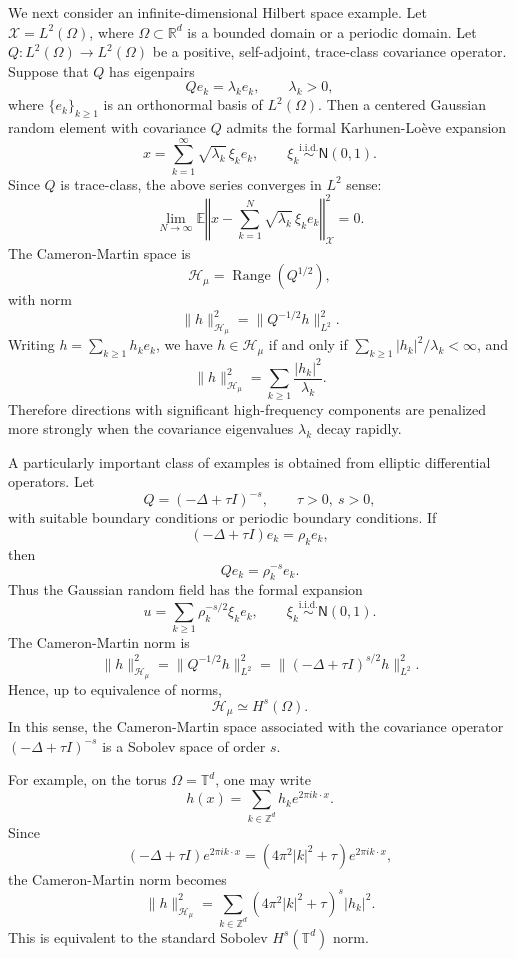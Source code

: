 \documentclass[11pt]{article}
\newcommand{\bbE}{\mathbb{E}}
\begin{document}
We next consider an infinite-dimensional Hilbert space example. Let $\mathcal X=L^2(\Omega)$, where $\Omega\subset\mathbb R^d$ is a bounded domain or a periodic domain. Let $Q:L^2(\Omega)\to L^2(\Omega)$ be a positive, self-adjoint, trace-class covariance operator. Suppose that $Q$ has eigenpairs
\[
    Q e_k = \lambda_k e_k,
    \qquad \lambda_k>0,
\]
where $\{e_k\}_{k\ge 1}$ is an orthonormal basis of $L^2(\Omega)$. Then a centered Gaussian random element with covariance $Q$ admits the formal Karhunen-Loève expansion
\[
    x=
    \sum_{k=1}^\infty\sqrt{\lambda_k}\,\xi_k e_k,
    \qquad
    \xi_k\stackrel{\mathrm{i.i.d.}}{\sim}\mathsf N(0,1).
\]
Since $Q$ is trace-class, the above series converges in $L^2$ sense:
\begin{equation*}
    \lim_{N\to\infty}\bbE\left\Vert x-\sum_{k=1}^N\sqrt{\lambda_k}\,\xi_k e_k\right\Vert^2_\mathcal{X}=0.
\end{equation*}
The Cameron-Martin space is
\[
    \mathcal H_\mu
    =
    \operatorname{Range}(Q^{1/2}),
\]
with norm
\[
    \|h\|_{\mathcal H_\mu}^2
    =
    \|Q^{-1/2}h\|_{L^2}^2.
\]
Writing $h=\sum_{k\ge 1} h_k e_k$, we have $h\in\mathcal H_\mu$ if and only if $\sum_{k\ge 1}|h_k|^2/\lambda_k<\infty$, and
\[
    \|h\|_{\mathcal H_\mu}^2
    =
    \sum_{k\ge 1}\frac{|h_k|^2}{\lambda_k}.
\]
Therefore directions with significant high-frequency components are penalized more strongly when the covariance eigenvalues $\lambda_k$ decay rapidly.

A particularly important class of examples is obtained from elliptic differential operators. Let
\[
    Q=(-\Delta+\tau I)^{-s},
    \qquad \tau>0,\ s>0,
\]
with suitable boundary conditions or periodic boundary conditions. If
\[
    (-\Delta+\tau I)e_k=\rho_k e_k,
\]
then
\[
    Qe_k=\rho_k^{-s}e_k.
\]
Thus the Gaussian random field has the formal expansion
\[
    u
    =
    \sum_{k\ge 1}\rho_k^{-s/2}\xi_k e_k,
    \qquad
    \xi_k\stackrel{\mathrm{i.i.d.}}{\sim}\mathsf N(0,1).
\]
The Cameron-Martin norm is
\[
    \|h\|_{\mathcal H_\mu}^2
    =
    \|Q^{-1/2}h\|_{L^2}^2
    =
    \|(-\Delta+\tau I)^{s/2}h\|_{L^2}^2.
\]
Hence, up to equivalence of norms,
\[
    \mathcal H_\mu \simeq H^s(\Omega).
\]
In this sense, the Cameron-Martin space associated with the covariance operator $(-\Delta+\tau I)^{-s}$ is a Sobolev space of order $s$.

For example, on the torus $\Omega=\mathbb T^d$, one may write
\[
    h(x)
    =
    \sum_{k\in\mathbb Z^d} h_k e^{2\pi i k\cdot x}.
\]
Since
\[
    (-\Delta+\tau I)e^{2\pi i k\cdot x}
    =
    (4\pi^2|k|^2+\tau)e^{2\pi i k\cdot x},
\]
the Cameron-Martin norm becomes
\[
    \|h\|_{\mathcal H_\mu}^2
    =
    \sum_{k\in\mathbb Z^d}
    (4\pi^2|k|^2+\tau)^s |h_k|^2.
\]
This is equivalent to the standard Sobolev $H^s(\mathbb T^d)$ norm.
\end{document}
